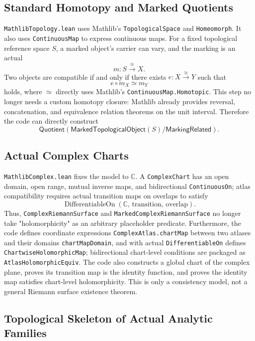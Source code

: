 \documentclass[UTF8,a4paper,11pt]{article}
\begin{document}
\subsection{Standard Homotopy and Marked Quotients}

\texttt{MathlibTopology.lean} uses Mathlib's \texttt{TopologicalSpace} and \texttt{Homeomorph}. It also uses \texttt{ContinuousMap} to express continuous maps. For a fixed topological reference space \(S\), a marked object's carrier can vary, and the marking is an actual
\[
  m:S\xrightarrow{\cong}X.
\]
Two objects are compatible if and only if there exists \(e:X\xrightarrow{\cong}Y\) such that
\[
  e\circ m_X\simeq m_Y
\]
holds, where \(\simeq\) directly uses Mathlib's \texttt{ContinuousMap.Homotopic}. This step no longer needs a custom homotopy closure: Mathlib already provides reversal, concatenation, and equivalence relation theorems on the unit interval. Therefore the code can directly construct
\[
  \mathsf{Quotient}(\mathsf{MarkedTopologicalObject}(S)/\mathsf{MarkingRelated}).
\]

\subsection{Actual Complex Charts}

\texttt{MathlibComplex.lean} fixes the model to \(\mathbb C\). A \texttt{ComplexChart} has an open domain, open range, mutual inverse maps, and bidirectional \texttt{ContinuousOn}; atlas compatibility requires actual transition maps on overlaps to satisfy
\[
  \operatorname{DifferentiableOn}(\mathbb C,\,\text{transition},\,\text{overlap}).
\]
Thus, \texttt{ComplexRiemannSurface} and \texttt{MarkedComplexRiemannSurface} no longer take "holomorphicity" as an arbitrary placeholder predicate. Furthermore, the code defines coordinate expressions \texttt{ComplexAtlas.chartMap} between two atlases and their domains \texttt{chartMapDomain}, and with actual \texttt{DifferentiableOn} defines \texttt{ChartwiseHolomorphicMap}; bidirectional chart-level conditions are packaged as \texttt{AtlasHolomorphicEquiv}. The code also constructs a global chart of the complex plane, proves its transition map is the identity function, and proves the identity map satisfies chart-level holomorphicity. This is only a consistency model, not a general Riemann surface existence theorem.

\subsection{Topological Skeleton of Actual Analytic Families}
\end{document}
